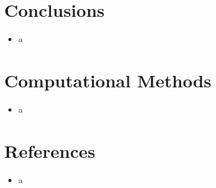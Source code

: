 \documentclass[10pt,letterpaper]{article}
\numberwithin{equation}{section}
\begin{document}

\section{Conclusions}
\begin{itemize}
	\item a
\end{itemize}


\section{Computational Methods}
\begin{itemize}
	\item a
\end{itemize}


\section{References}
\begin{itemize}
	\item a
\end{itemize}

\end{document}
